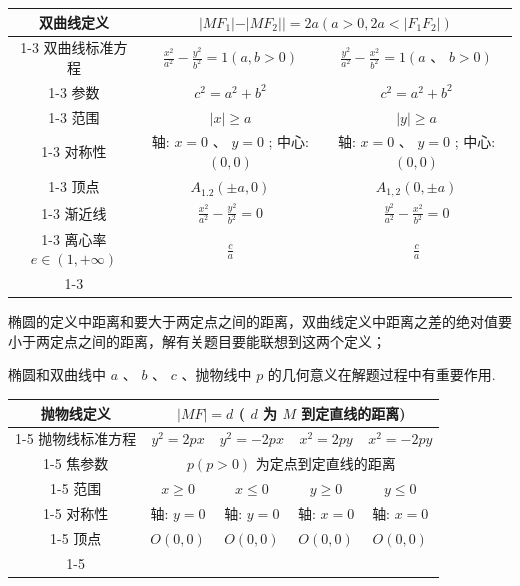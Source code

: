 \begin{center}
\begin{tabular}{|c|c|c|}
\hline
双曲线定义 & \multicolumn{2}{|c|}{$\left. {\left. \right| M{F}_{1}\left| -\right| M{F}_{2}\left| \right|  = {2a}\left( {a > 0,{2a} < }\right. \left| {{F}_{1}{F}_{2}}\right| }\right)$} \\
\cline{1-3}
双曲线标准方程 & $\frac{{x}^{2}}{{a}^{2}} - \frac{{y}^{2}}{{b}^{2}} = 1\left( {a,b > 0}\right)$ & $\frac{{y}^{2}}{{a}^{2}} - \frac{{x}^{2}}{{b}^{2}} = 1\left( {a\text{ 、 }b > 0}\right)$ \\
\cline{1-3}
参数 & ${c}^{2} = {a}^{2} + {b}^{2}$ & ${c}^{2} = {a}^{2} + {b}^{2}$ \\
\cline{1-3}
范围 & $\left| x\right|  \geq  a$ & $\left| y\right|  \geq  a$ \\
\cline{1-3}
对称性 & 轴: $x = 0\text{ 、 }y = 0$ ; 中心: $\left( {0,0}\right)$ & 轴: $x = 0\text{ 、 }y = 0$ ; 中心: $\left( {0,0}\right)$ \\
\cline{1-3}
顶点 & ${A}_{1.2}\left( {\pm a,0}\right)$ & ${A}_{1,2}\left( {0, \pm  a}\right)$ \\
\cline{1-3}
渐近线 & $\frac{{x}^{2}}{{a}^{2}} - \frac{{y}^{2}}{{b}^{2}} = 0$ & $\frac{{y}^{2}}{{a}^{2}} - \frac{{x}^{2}}{{b}^{2}} = 0$ \\
\cline{1-3}
离心率 $e \in  \left( {1, + \infty }\right)$ & $\frac{c}{a}$ & $\frac{c}{a}$ \\
\cline{1-3}
\hline
\end{tabular}
\end{center}

  椭圆的定义中距离和要大于两定点之间的距离，双曲线定义中距离之差的绝对值要小于两定点之间的距离，解有关题目要能联想到这两个定义；

   椭圆和双曲线中 $a$ 、 $b$ 、 $c$ 、抛物线中 $p$ 的几何意义在解题过程中有重要作用.

\begin{center}
\begin{tabular}{|c|c|c|c|c|}
\hline
抛物线定义 & \multicolumn{4}{|c|}{$\left| {MF}\right|  = d$ ( $d$ 为 $M$ 到定直线的距离)} \\
\cline{1-5}
抛物线标准方程 & ${y}^{2} = {2px}$ & ${y}^{2} =  - {2px}$ & ${x}^{2} = {2py}$ & ${x}^{2} =  - {2py}$ \\
\cline{1-5}
焦参数 & \multicolumn{4}{|c|}{$p\left( {p > 0}\right)$ 为定点到定直线的距离} \\
\cline{1-5}
范围 & $x \geq  0$ & $x \leq  0$ & $y \geq  0$ & $y \leq  0$ \\
\cline{1-5}
对称性 & 轴: $y = 0$ & 轴: $y = 0$ & 轴: $x = 0$ & 轴: $x = 0$ \\
\cline{1-5}
顶点 & $O\left( {0,0}\right)$ & $O\left( {0,0}\right)$ & $O\left( {0,0}\right)$ & $O\left( {0,0}\right)$ \\
\cline{1-5}
\hline
\end{tabular}
\end{center}

